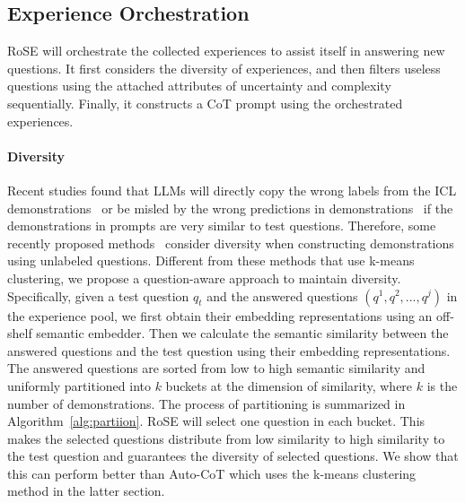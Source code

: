 \documentclass[11pt]{article}
\begin{document}

\subsection{Experience Orchestration}
RoSE will orchestrate the collected experiences to assist itself in answering new questions. It first considers the diversity of experiences, and then filters useless questions using the attached attributes of uncertainty and complexity sequentially. Finally, it constructs a CoT prompt using the orchestrated experiences.


\paragraph{Diversity} Recent studies found that LLMs will directly copy the wrong labels from the ICL demonstrations~\cite{lyu2023z-icl} or be misled by the wrong predictions in demonstrations~\cite{zhang2033auto-cot} if the demonstrations in prompts are very similar to test questions. Therefore, some recently proposed methods~\cite{zhang2033auto-cot,li2023mot} consider diversity when constructing demonstrations using unlabeled questions. Different from these methods that use k-means clustering, we propose a question-aware approach to maintain diversity. Specifically, given a test question $q_t$ and the answered questions $(q^1, q^2, ..., q^j)$ in the experience pool, we first obtain their embedding representations using an off-shelf semantic embedder. Then we calculate the semantic similarity between the answered questions and the test question using their embedding representations. The answered questions are sorted from low to high semantic similarity and uniformly partitioned into $k$ buckets at the dimension of similarity, where $k$ is the number of demonstrations. The process of partitioning is summarized in Algorithm~\ref{alg:partiion}. RoSE will select one question in each bucket. This makes the selected questions distribute from low similarity to high similarity to the test question and guarantees the diversity of selected questions. We show that this can perform better than Auto-CoT which uses the k-means clustering method in the latter section.
\end{document}
